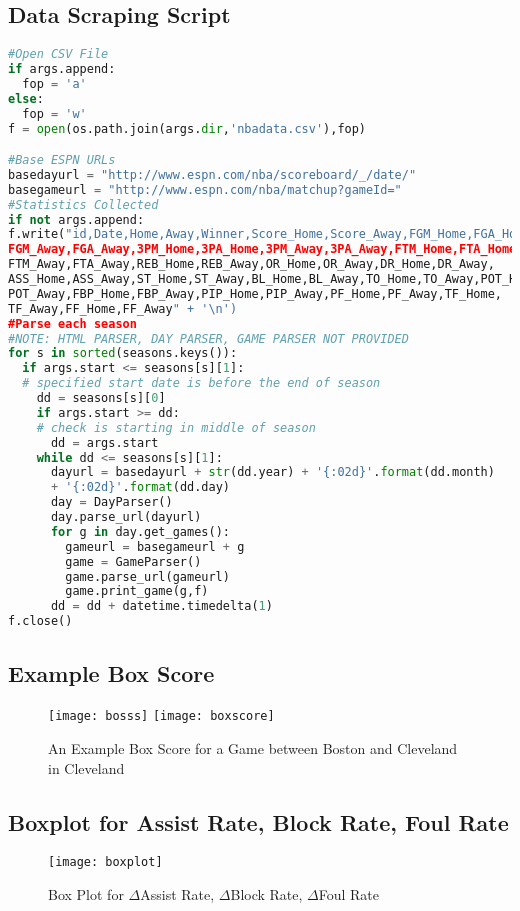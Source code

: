\documentclass{article}
\begin{document}
\subsection{Data Scraping Script}
\hypertarget{htmlcode}{ }
\begin{lstlisting}[language=Python, caption=ESPN Box Score Web Scraper]
#Open CSV File
if args.append:
  fop = 'a'
else:
  fop = 'w'
f = open(os.path.join(args.dir,'nbadata.csv'),fop)

#Base ESPN URLs
basedayurl = "http://www.espn.com/nba/scoreboard/_/date/"
basegameurl = "http://www.espn.com/nba/matchup?gameId="
#Statistics Collected
if not args.append:
f.write("id,Date,Home,Away,Winner,Score_Home,Score_Away,FGM_Home,FGA_Home,
FGM_Away,FGA_Away,3PM_Home,3PA_Home,3PM_Away,3PA_Away,FTM_Home,FTA_Home,
FTM_Away,FTA_Away,REB_Home,REB_Away,OR_Home,OR_Away,DR_Home,DR_Away,
ASS_Home,ASS_Away,ST_Home,ST_Away,BL_Home,BL_Away,TO_Home,TO_Away,POT_Home,
POT_Away,FBP_Home,FBP_Away,PIP_Home,PIP_Away,PF_Home,PF_Away,TF_Home,
TF_Away,FF_Home,FF_Away" + '\n')
#Parse each season
#NOTE: HTML PARSER, DAY PARSER, GAME PARSER NOT PROVIDED
for s in sorted(seasons.keys()):
  if args.start <= seasons[s][1]:   
  # specified start date is before the end of season 
    dd = seasons[s][0]
    if args.start >= dd:            
    # check is starting in middle of season
      dd = args.start
    while dd <= seasons[s][1]:
      dayurl = basedayurl + str(dd.year) + '{:02d}'.format(dd.month)
      + '{:02d}'.format(dd.day)
      day = DayParser()
      day.parse_url(dayurl)
      for g in day.get_games():
        gameurl = basegameurl + g
        game = GameParser()
        game.parse_url(gameurl)
        game.print_game(g,f)
      dd = dd + datetime.timedelta(1)
f.close()
\end{lstlisting}
\subsection{Example Box Score}
\begin{figure}[H]
    \centering
    \label{figboxscore}
    \texttt{[image: bosss]}
    \texttt{[image: boxscore]}
    \caption{An Example Box Score for a Game between Boston and Cleveland in Cleveland}
\end{figure}

\subsection{Boxplot for Assist Rate, Block Rate, Foul Rate}
\begin{figure}[H]
    \centering
    \label{figboxplot}
    \texttt{[image: boxplot]}
    \caption{Box Plot for $\Delta$Assist Rate, $\Delta$Block Rate, $\Delta$Foul Rate}
\end{figure}
\end{document}
